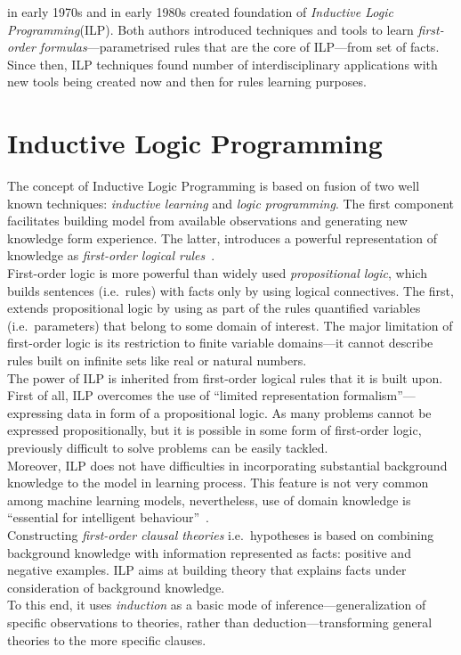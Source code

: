 \documentclass[12pt, a4paper, pdflatex, leqno, twoside, openright]{report}
\begin{document}
\citeauthor{plotkin1972automatic} in early 1970s and \citeauthor{shapiro1983algorithmic} in early 1980s created foundation of \emph{Inductive Logic Programming}(ILP). Both authors introduced techniques and tools to learn \emph{first-order formulas}---parametrised rules that are the core of ILP---from set of facts. Since then, ILP techniques found number of interdisciplinary applications with new tools being created now and then for rules learning purposes.

  \section{Inductive Logic Programming}
The concept of Inductive Logic Programming is based on fusion of two well known techniques: \emph{inductive learning} and \emph{logic programming}. The first component facilitates building model from available observations and generating new knowledge form experience. The latter, introduces a powerful representation of knowledge as \emph{first-order logical rules}~\citep{muggleton1994inductive,muggleton1995inverse}.\\

First-order logic is more powerful than widely used \emph{propositional logic}, which builds sentences (i.e.\ rules) with facts only by using logical connectives. The first, extends propositional logic by using as part of the rules quantified variables (i.e.\ parameters) that belong to some domain of interest. The major limitation of first-order logic is its restriction to finite variable domains---it cannot describe rules built on infinite sets like real or natural numbers.\\ %

The power of ILP is inherited from first-order logical rules that it is built upon. First of all, ILP overcomes the use of ``limited representation formalism''---expressing data in form of a propositional logic. As many problems cannot be expressed propositionally, but it is possible in some form of first-order logic, previously difficult to solve problems can be easily tackled.\\
Moreover, ILP does not have difficulties in incorporating substantial background knowledge to the model in learning process. This feature is not very common among machine learning models, nevertheless, use of domain knowledge is ``essential for intelligent behaviour''~\citep{muggleton1994inductive}.\\

Constructing \emph{first-order clausal theories} i.e.\ hypotheses is based on combining background knowledge with information represented as facts: positive and negative examples. ILP aims at building theory that explains facts under consideration of background knowledge.\\
To this end, it uses \emph{induction} as a basic mode of inference---generalization of specific observations to theories, rather than deduction---transforming general theories to the more specific clauses.\\
\end{document}

